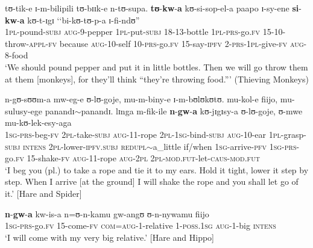 \begin{exe}
\ex \label{exkwakuThievingMonkeys} \gll tʊ-tik-e ɪ-m-bilipili tʊ-bɪɪk-e n-tʊ-supa. \textbf{tʊ}-\textbf{kw}-\textbf{a} kʊ-si-sop-el-a paapo ɪ-sy-ene \textbf{si}-\textbf{kw}-\textbf{a} kʊ-t-ɪgɪ \textup{\lq\lq}bi-kʊ-tʊ-p-a ɪ-fi-ndʊ\textup{''}\\
\textsc{1pl}-pound-\textsc{subj} \textsc{aug}-9-pepper \textsc{1pl}-put-\textsc{subj} 18-13-bottle \textsc{1pl}-\textsc{prs}-go.\textsc{fv} 15-10-throw-\textsc{appl}-\textsc{fv} because \textsc{aug}-10-self 10-\textsc{prs}-go.\textsc{fv} 15-say-\textsc{ipfv} \phantom{\lq\lq}2-\textsc{prs}-\textsc{1pl}-give-\textsc{fv} \textsc{aug}-8-food\\
\glt `We should pound pepper and put it in little bottles. Then we will go throw them at them [monkeys], for they'll think ``they're throwing food.''{}' (Thieving Monkeys)%

\ex \label{exkwakuHareSpider}
\gll n-gʊ-sʊʊm-a mw-eg-e ʊ-lʊ-goje, mu-m-biny-e ɪ-m-bʊlʊkʊtʊ. mu-kol-e fiijo, mu-sulusy-ege panandɪ$\sim$panandɪ. lɪnga m-fik-ile \textbf{n}-\textbf{gw}-\textbf{a} kʊ-jɪgɪsy-a ʊ-lʊ-goje, ʊ-mwe mu-kʊ-lek-esy-aga\\
\textsc{1sg}-\textsc{prs}-beg-\textsc{fv} \textsc{2pl}-take-\textsc{subj} \textsc{aug}-11-rope \textsc{2pl}-\textsc{1sg}-bind-\textsc{subj} \textsc{aug}-10-ear \textsc{1pl}-grasp-\textsc{subj} \textsc{intens} \textsc{2pl}-lower-\textsc{ipfv.subj} \textsc{redupl}$\sim$a\_little if/when \textsc{1sg}-arrive-\textsc{pfv} \textsc{1sg}-\textsc{prs}-go.\textsc{fv} 15-shake-\textsc{fv} \textsc{aug}-11-rope  \textsc{aug}-\textsc{2pl} \textsc{2pl}-\textsc{mod.fut}-let-\textsc{caus}-\textsc{mod.fut}\\
\glt `I beg you (pl.) to take a rope and tie it to my ears. Hold it tight, lower it step by step. When I arrive [at the ground] I will shake the rope and you shall let go of it.' [Hare and Spider] %

\ex \label{exkwakuHareHippo}\gll \textbf{n}-\textbf{gw}-\textbf{a} kw-is-a n=ʊ-n-kamu gw-angʊ ʊ-n-nywamu fiijo\\
\textsc{1sg}-\textsc{prs}-go.\textsc{fv} 15-come-\textsc{fv} \textsc{com}=\textsc{aug}-1-relative 1-\textsc{poss.1sg} \textsc{aug}-1-big \textsc{intens}\\
\glt `I will come with my very big relative.' [Hare and Hippo] %
\end{exe}

